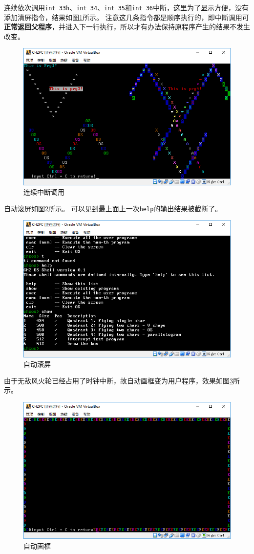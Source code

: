 \documentclass[logo,reportComp]{thesis}
\begin{document}
连续依次调用\verb'int 33h'、\verb'int 34'、\verb'int 35'和\verb'int 36'中断，这里为了显示方便，没有添加清屏指令，结果如图\ref{fig:int_4}所示。
注意这几条指令都是顺序执行的，即中断调用可\textbf{正常返回父程序}，并进入下一行执行，所以才有办法保持原程序产生的结果不发生改变。
\begin{figure}[H]
\centering
\includegraphics[width=0.8\linewidth]{fig/int_4.PNG}
\caption{连续中断调用}
\label{fig:int_4}
\end{figure}

自动滚屏如图\ref{fig:sroll_down}所示。
可以见到最上面上一次\verb'help'的输出结果被截断了。
\begin{figure}[H]
\centering
\includegraphics[width=0.8\linewidth]{fig/sroll_down.PNG}
\caption{自动滚屏}
\label{fig:sroll_down}
\end{figure}

由于无敌风火轮已经占用了时钟中断，故自动画框变为用户程序，效果如图\ref{fig:box}所示。
\begin{figure}[H]
\centering
\includegraphics[width=0.8\linewidth]{fig/box.PNG}
\caption{自动画框}
\label{fig:box}
\end{figure}
\end{document}
